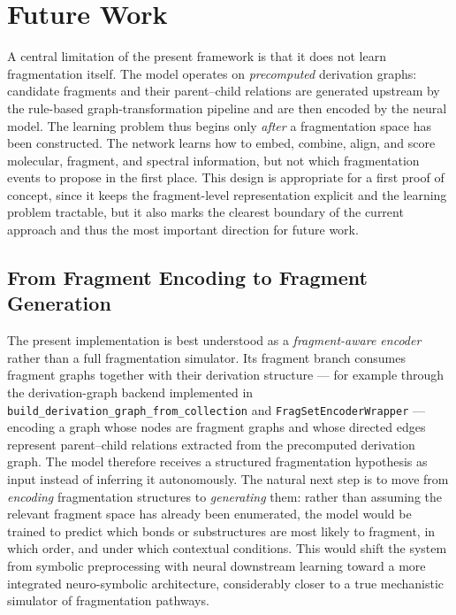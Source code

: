 \chapter{Future Work}
\label{ch:5}
\noindent

A central limitation of the present framework is that it does not learn fragmentation itself.
The model operates on \emph{precomputed} derivation graphs: candidate fragments and their parent--child relations are generated upstream by the rule-based graph-transformation pipeline and are then encoded by the neural model.
The learning problem thus begins only \emph{after} a fragmentation space has been constructed.
The network learns how to embed, combine, align, and score molecular, fragment, and spectral information, but not which fragmentation events to propose in the first place.
This design is appropriate for a first proof of concept, since it keeps the fragment-level representation explicit and the learning problem tractable, but it also marks the clearest boundary of the current approach and thus the most important direction for future work.

\section{From Fragment Encoding to Fragment Generation}
The present implementation is best understood as a \emph{fragment-aware encoder} rather than a full fragmentation simulator.
Its fragment branch consumes fragment graphs together with their derivation structure --- for example through the derivation-graph backend implemented in \texttt{build\_derivation\_graph\_from\_collection} and \texttt{FragSetEncoderWrapper} --- encoding a graph whose nodes are fragment graphs and whose directed edges represent parent--child relations extracted from the precomputed derivation graph.
The model therefore receives a structured fragmentation hypothesis as input instead of inferring it autonomously.
The natural next step is to move from \emph{encoding} fragmentation structures to \emph{generating} them: rather than assuming the relevant fragment space has already been enumerated, the model would be trained to predict which bonds or substructures are most likely to fragment, in which order, and under which contextual conditions.
This would shift the system from symbolic preprocessing with neural downstream learning toward a more integrated neuro-symbolic architecture, considerably closer to a true mechanistic simulator of fragmentation pathways.


